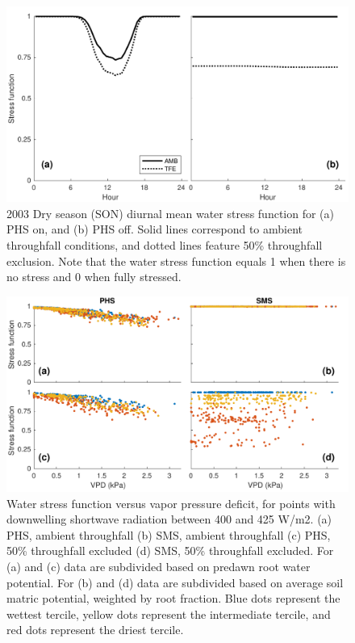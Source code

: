 \documentclass[draft,linenumbers]{agujournal}
\begin{document}
          \clearpage
    \begin{figure}[h]
     \centering
     \includegraphics[width=30pc]{../figs/fig4.pdf}
     \caption{2003 Dry season (SON) diurnal mean water stress function for 
     (a) PHS on, and
     (b) PHS off.
     Solid lines correspond to ambient throughfall conditions, and dotted lines feature 50\% throughfall exclusion.
     Note that the water stress function equals 1 when there is no stress and 0 when fully stressed.
     }
     \label{fig4}
  \end{figure}
  
      \clearpage
    \begin{figure}[h]
     \centering
     \includegraphics[width=30pc]{../figs/fig5.pdf}
     \caption{Water stress function versus vapor pressure deficit, for points with downwelling shortwave radiation between 400 and 425 W/m2.
     (a) PHS, ambient throughfall
     (b) SMS, ambient throughfall
     (c) PHS, 50\% throughfall excluded
     (d) SMS, 50\% throughfall excluded. 
     For (a) and (c) data are subdivided based on predawn root water potential.
     For (b) and (d) data are subdivided based on average soil matric potential, weighted by root fraction.
     Blue dots represent the wettest tercile, yellow dots represent the intermediate tercile, and red dots represent the driest tercile.
     }
     \label{fig5}
       \end{figure}
  
\end{document}
